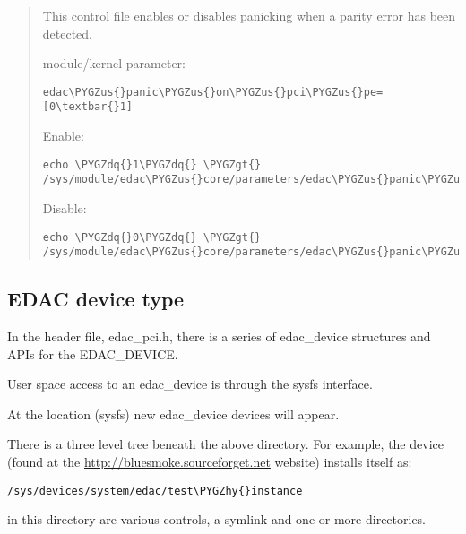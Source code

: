 \documentclass[a4paper,8pt,english]{sphinxmanual}
\def\PYGZus{\char`\_}
\def\PYGZgt{\char`\>}
\def\PYGZhy{\char`\-}
\def\PYGZdq{\char`\"}
\begin{document}
\begin{itemize}
\begin{quote}
This control file enables or disables panicking when a parity
error has been detected.

module/kernel parameter:

\begin{Verbatim}[commandchars=\\\{\}]
edac\PYGZus{}panic\PYGZus{}on\PYGZus{}pci\PYGZus{}pe=[0\textbar{}1]
\end{Verbatim}

Enable:

\begin{Verbatim}[commandchars=\\\{\}]
echo \PYGZdq{}1\PYGZdq{} \PYGZgt{} /sys/module/edac\PYGZus{}core/parameters/edac\PYGZus{}panic\PYGZus{}on\PYGZus{}pci\PYGZus{}pe
\end{Verbatim}

Disable:

\begin{Verbatim}[commandchars=\\\{\}]
echo \PYGZdq{}0\PYGZdq{} \PYGZgt{} /sys/module/edac\PYGZus{}core/parameters/edac\PYGZus{}panic\PYGZus{}on\PYGZus{}pci\PYGZus{}pe
\end{Verbatim}
\end{quote}

\end{itemize}


\subsection{EDAC device type}
\label{admin-guide/ras:edac-device-type}
In the header file, edac\_pci.h, there is a series of edac\_device structures
and APIs for the EDAC\_DEVICE.

User space access to an edac\_device is through the sysfs interface.

At the location  (sysfs) new edac\_device devices
will appear.

There is a three level tree beneath the above  directory. For example,
the  device (found at the \href{http://bluesmoke.sourceforget.net}{http://bluesmoke.sourceforget.net}
website) installs itself as:

\begin{Verbatim}[commandchars=\\\{\}]
/sys/devices/system/edac/test\PYGZhy{}instance
\end{Verbatim}

in this directory are various controls, a symlink and one or more 
directories.
\end{document}

